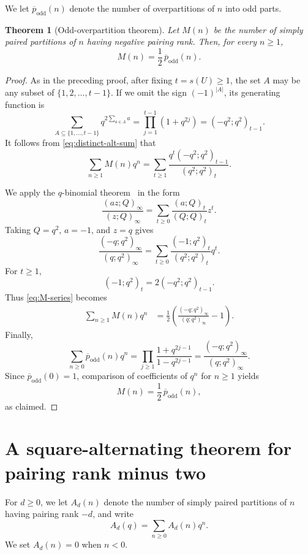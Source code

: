 \documentclass[11pt]{article}
\newtheorem{theorem}{Theorem}[section]
\theoremstyle{definition}
\theoremstyle{remark}
\begin{document}
We let $\overline p_{\mathrm{odd}}(n)$ denote the number of overpartitions of $n$ into odd parts.

\begin{theorem}[Odd-overpartition theorem]\label{thm:odd-overpartition}
Let $M(n)$ be the number of simply paired partitions of $n$ having negative pairing rank.  Then, for every $n\geq1$,
\[
 M(n)=\frac12\,\overline p_{\mathrm{odd}}(n).
\]
\end{theorem}

\begin{proof}
As in the preceding proof, after fixing $t=s(U)\geq1$, the set $A$ may be any subset of $\{1,2,\ldots,t-1\}$.  If we omit the sign $(-1)^{|A|}$, its generating function is
\[
 \sum_{A\subseteq\{1,\ldots,t-1\}}
 q^{2\sum_{a\in A}a}
 =\prod_{j=1}^{t-1}(1+q^{2j})
 =(-q^2;q^2)_{t-1}.
\]
It follows from \eqref{eq:distinct-alt-sum} that
\begin{equation}\label{eq:M-series}
 \sum_{n\geq1}M(n)q^n
 =\sum_{t\geq1}
 \frac{q^t(-q^2;q^2)_{t-1}}{(q^2;q^2)_t}.
\end{equation}

We apply the $q$-binomial theorem~\cite[Chapter~2]{AndrewsPartitions} in the form
\[
 \frac{(az;Q)_\infty}{(z;Q)_\infty}
 =\sum_{t\geq0}\frac{(a;Q)_t}{(Q;Q)_t}z^t.
\]
Taking $Q=q^2$, $a=-1$, and $z=q$ gives
\[
 \frac{(-q;q^2)_\infty}{(q;q^2)_\infty}
 =\sum_{t\geq0}\frac{(-1;q^2)_t}{(q^2;q^2)_t}q^t.
\]
For $t\geq1$,
\[
 (-1;q^2)_t
 =2(-q^2;q^2)_{t-1}.
\]
Thus \eqref{eq:M-series} becomes
\begin{align*}
 \sum_{n\geq1}M(n)q^n
 &=\frac12\left(
 \frac{(-q;q^2)_\infty}{(q;q^2)_\infty}-1
 \right).
\end{align*}
Finally,
\[
 \sum_{n\geq0}\overline p_{\mathrm{odd}}(n)q^n
 =\prod_{j\geq1}\frac{1+q^{2j-1}}{1-q^{2j-1}}
 =\frac{(-q;q^2)_\infty}{(q;q^2)_\infty}.
\]
Since $\overline p_{\mathrm{odd}}(0)=1$, comparison of coefficients of $q^n$ for $n\geq1$ yields
\[
 M(n)=\frac12\,\overline p_{\mathrm{odd}}(n),
\]
as claimed.
\end{proof}

\section{A square-alternating theorem for pairing rank minus two}

For $d\geq0$, we let $A_d(n)$ denote the number of simply paired partitions of $n$ having pairing rank $-d$, and write
\[
 A_d(q)=\sum_{n\geq0}A_d(n)q^n.
\]
We set $A_d(n)=0$ when $n<0$.
\end{document}
